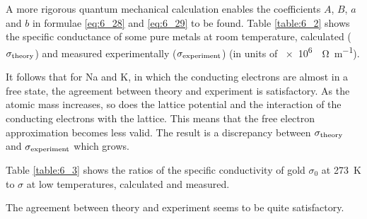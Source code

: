 A more rigorous quantum mechanical calculation enables the coefficients $A$, $B$, $a$ and $b$ in formulae \eqref{eq:6_28} and \eqref{eq:6_29} to be found. Table \ref{table:6_2} shows the specific conductance of some pure metals at room temperature, calculated ($\sigma_{\text{theory}}$) and measured experimentally ($\sigma_{\text{experiment}}$) (in units of \SI{e6}{\per\ohm\per\metre}).

It follows that for Na and K, in which the conducting electrons are almost in a free state, the agreement between theory and experiment is satisfactory. As the atomic mass increases, so does the lattice potential and the interaction of the conducting electrons with the
lattice. This means that the free electron approximation becomes less valid. The result is a discrepancy between $\sigma_{\text{theory}}$ and $\sigma_{\text{experiment}}$ which grows.

Table \ref{table:6_3} shows the ratios of the specific conductivity of gold $\sigma_0$ at \SI{273}{\kelvin} to $\sigma$ at low temperatures, calculated and measured.

The agreement between theory and experiment seems to be quite satisfactory.

\begin{table}[!b]
	\renewcommand{\arraystretch}{1.2}
	\caption{}
	\vspace{-0.6cm}
	\label{table:6_2}
	\begin{center}\end{center}
\end{table}

\begin{table}[!b]
	\renewcommand{\arraystretch}{1.2}
	\caption{}
	\vspace{-0.6cm}
	\label{table:6_3}
	\begin{center}\end{center}
\end{table}

